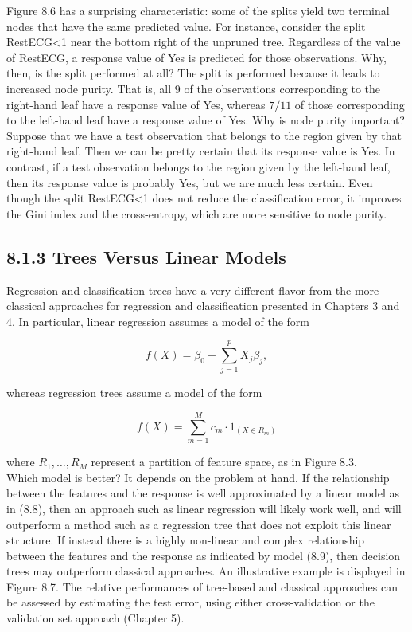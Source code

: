 \documentclass[10pt]{article}
\begin{document}
Figure 8.6 has a surprising characteristic: some of the splits yield two terminal nodes that have the same predicted value. For instance, consider the split RestECG<1 near the bottom right of the unpruned tree. Regardless of the value of RestECG, a response value of Yes is predicted for those observations. Why, then, is the split performed at all? The split is performed because it leads to increased node purity. That is, all 9 of the observations corresponding to the right-hand leaf have a response value of Yes, whereas $7 / 11$ of those corresponding to the left-hand leaf have a response value of Yes. Why is node purity important? Suppose that we have a test observation that belongs to the region given by that right-hand leaf. Then we can be pretty certain that its response value is Yes. In contrast, if a test observation belongs to the region given by the left-hand leaf, then its response value is probably Yes, but we are much less certain. Even though the split RestECG<1 does not reduce the classification error, it improves the Gini index and the cross-entropy, which are more sensitive to node purity.

\subsection*{8.1.3 Trees Versus Linear Models}
Regression and classification trees have a very different flavor from the more classical approaches for regression and classification presented in Chapters 3 and 4. In particular, linear regression assumes a model of the form


\begin{equation*}
f(X)=\beta_{0}+\sum_{j=1}^{p} X_{j} \beta_{j}, \tag{8.8}
\end{equation*}


whereas regression trees assume a model of the form


\begin{equation*}
f(X)=\sum_{m=1}^{M} c_{m} \cdot 1_{\left(X \in R_{m}\right)} \tag{8.9}
\end{equation*}


where $R_{1}, \ldots, R_{M}$ represent a partition of feature space, as in Figure 8.3.\\
Which model is better? It depends on the problem at hand. If the relationship between the features and the response is well approximated by a linear model as in (8.8), then an approach such as linear regression will likely work well, and will outperform a method such as a regression tree that does not exploit this linear structure. If instead there is a highly non-linear and complex relationship between the features and the response as indicated by model (8.9), then decision trees may outperform classical approaches. An illustrative example is displayed in Figure 8.7. The relative performances of tree-based and classical approaches can be assessed by estimating the test error, using either cross-validation or the validation set approach (Chapter 5).
\end{document}

